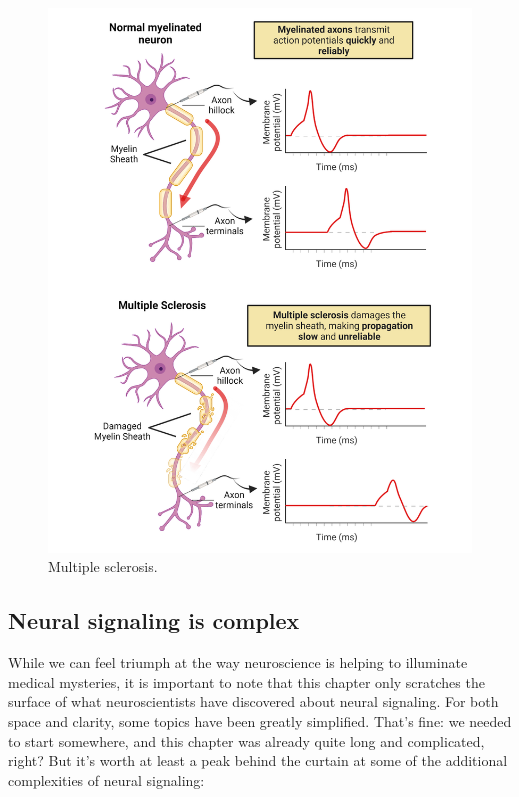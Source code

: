 \documentclass[
]{book}
\begin{document}
\begin{figure}

{\centering \includegraphics[width=0.9\linewidth]{images/ch02/02_31} 

}

\caption{Multiple sclerosis.}\label{fig:multiple-sclerosis}
\end{figure}

\hypertarget{neural-signaling-is-complex}{%
\subsection{Neural signaling is complex}\label{neural-signaling-is-complex}}

While we can feel triumph at the way neuroscience is helping to illuminate medical mysteries, it is important to note that this chapter only scratches the surface of what neuroscientists have discovered about neural signaling. For both space and clarity, some topics have been greatly simplified. That's fine: we needed to start somewhere, and this chapter was already quite long and complicated, right? But it's worth at least a peak behind the curtain at some of the additional complexities of neural signaling:
\end{document}
